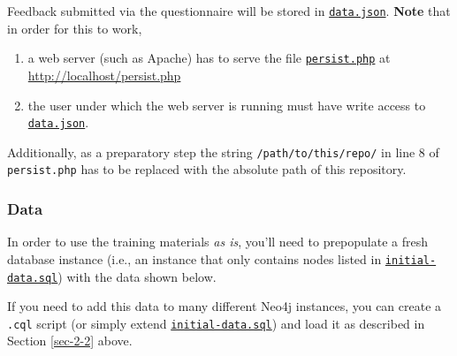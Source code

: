 \documentclass[11pt]{article}
\begin{document}
Feedback submitted via the questionnaire will be stored in
\href{training-materials/questionaire/answers/data.json}{\texttt{data.json}}. \textbf{Note} that in order for this to work,

\begin{enumerate}
\item a web server (such as Apache) has to serve the file
\href{training-materials/questionaire/persist.php}{\texttt{persist.php}} at \url{http://localhost/persist.php}
\item the user under which the web server is running must have write
access to \href{training-materials/questionaire/answers/data.json}{\texttt{data.json}}.
\end{enumerate}

Additionally, as a preparatory step the string
\texttt{/path/to/this/repo/} in line 8 of \texttt{persist.php} has to be
replaced with the absolute path of this repository.

\subsubsection{Data}
\label{sec-3-4-1}
In order to use the training materials \emph{as is}, you'll need to
prepopulate a fresh database instance (i.e., an instance that only
contains nodes listed in \href{initial-data.cql}{\texttt{initial-data.sql}}) with the data shown
below.

If you need to add this data to many different Neo4j instances, you
can create a \texttt{.cql} script (or simply extend \href{initial-data.cql}{\texttt{initial-data.sql}})
and load it as described in Section \ref{sec-2-2} above.
\end{document}
